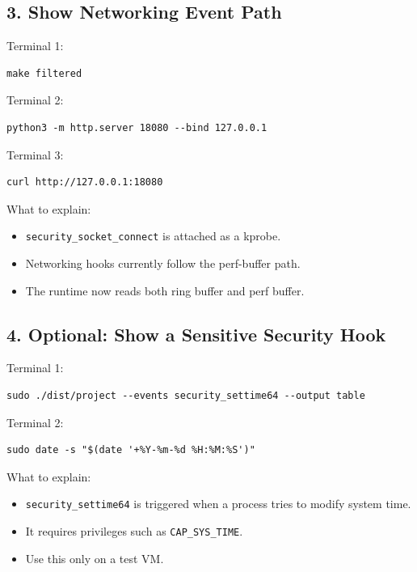 \documentclass[11pt,a4paper]{article}
\begin{document}
\subsection{3. Show Networking Event Path}

Terminal 1:

\begin{lstlisting}[style=terminal]
make filtered
\end{lstlisting}

Terminal 2:

\begin{lstlisting}[style=terminal]
python3 -m http.server 18080 --bind 127.0.0.1
\end{lstlisting}

Terminal 3:

\begin{lstlisting}[style=terminal]
curl http://127.0.0.1:18080
\end{lstlisting}

What to explain:

\begin{itemize}
  \item \texttt{security\_socket\_connect} is attached as a kprobe.
  \item Networking hooks currently follow the perf-buffer path.
  \item The runtime now reads both ring buffer and perf buffer.
\end{itemize}

\subsection{4. Optional: Show a Sensitive Security Hook}

Terminal 1:

\begin{lstlisting}[style=terminal]
sudo ./dist/project --events security_settime64 --output table
\end{lstlisting}

Terminal 2:

\begin{lstlisting}[style=terminal]
sudo date -s "$(date '+%Y-%m-%d %H:%M:%S')"
\end{lstlisting}

What to explain:

\begin{itemize}
  \item \texttt{security\_settime64} is triggered when a process tries to modify system time.
  \item It requires privileges such as \texttt{CAP\_SYS\_TIME}.
  \item Use this only on a test VM.
\end{itemize}
\end{document}
